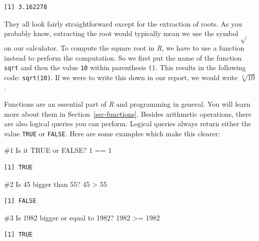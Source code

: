 \documentclass[
  letterpaper,
  DIV=11,
  numbers=noendperiod]{scrreprt}
\newenvironment{Shaded}{\begin{snugshade}}{\end{snugshade}}
\newcommand{\CommentTok}[1]{\textcolor[rgb]{0.37,0.37,0.37}{#1}}
\newcommand{\DecValTok}[1]{\textcolor[rgb]{0.68,0.00,0.00}{#1}}
\newcommand{\SpecialCharTok}[1]{\textcolor[rgb]{0.37,0.37,0.37}{#1}}
\begin{document}
\begin{verbatim}
[1] 3.162278
\end{verbatim}

They all look fairly straightforward except for the extraction of roots.
As you probably know, extracting the root would typically mean we use
the symbol \(\sqrt{}\) on our calculator. To compute the square root in
\emph{R}, we have to use a function instead to perform the computation.
So we first put the name of the function \texttt{sqrt} and then the
value \texttt{10} within parenthesis \texttt{()}. This results in the
following code: \texttt{sqrt(10)}. If we were to write this down in our
report, we would write \(\sqrt[2]{10}\).

Functions are an essential part of \emph{R} and programming in general.
You will learn more about them in Section~\ref{sec-functions}. Besides
arithmetic operations, there are also logical queries you can perform.
Logical queries always return either the value \texttt{TRUE} or
\texttt{FALSE}. Here are some examples which make this clearer:

\begin{Shaded}
\begin{Highlighting}[]
\CommentTok{\#1 Is it TRUE or FALSE?}
\DecValTok{1} \SpecialCharTok{==} \DecValTok{1}
\end{Highlighting}
\end{Shaded}

\begin{verbatim}
[1] TRUE
\end{verbatim}

\begin{Shaded}
\begin{Highlighting}[]
\CommentTok{\#2 Is 45 bigger than 55?}
\DecValTok{45} \SpecialCharTok{\textgreater{}} \DecValTok{55}
\end{Highlighting}
\end{Shaded}

\begin{verbatim}
[1] FALSE
\end{verbatim}

\begin{Shaded}
\begin{Highlighting}[]
\CommentTok{\#3 Is 1982 bigger or equal to 1982?}
\DecValTok{1982} \SpecialCharTok{\textgreater{}=} \DecValTok{1982}
\end{Highlighting}
\end{Shaded}

\begin{verbatim}
[1] TRUE
\end{verbatim}
\end{document}
